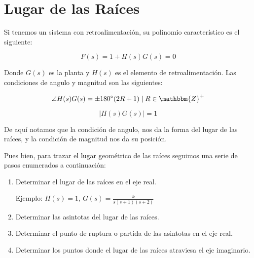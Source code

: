 
\chapter{Lugar de las Raíces}
	Si tenemos un sistema con retroalimentación, su polinomio característico es el siguiente:

	\begin{equation}
		F(s) = 1 + H(s) G(s) = 0
	\end{equation}

	Donde $G(s)$ es la planta y $H(s)$ es el elemento de retroalimentación. Las condiciones de angulo y magnitud son las siguientes:

	\begin{equation}
		\angle H(s) G(s) = \pm 180^{\circ} (2R + 1) \mid R \in \mathbbm{Z}^+
	\end{equation}

	\begin{equation}
		\lvert H(s) G(s) \rvert = 1
	\end{equation}

	De aquí notamos que la condición de angulo, nos da la forma del lugar de las raíces, y la condición de magnitud nos da su posición.

	Pues bien, para trazar el lugar geométrico de las raíces seguimos una serie de pasos enumerados a continuación:

	\begin{enumerate}
		\item Determinar el lugar de las raíces en el eje real.

		Ejemplo: $H(s) = 1$, $G(s) = \frac{k}{s(s+1)(s+2)}$

		\item Determinar las asintotas del lugar de las raíces.
		\item Determinar el punto de ruptura o partida de las asintotas en el eje real.
		\item Determinar los puntos donde el lugar de las raíces atraviesa el eje imaginario.
	\end{enumerate}
